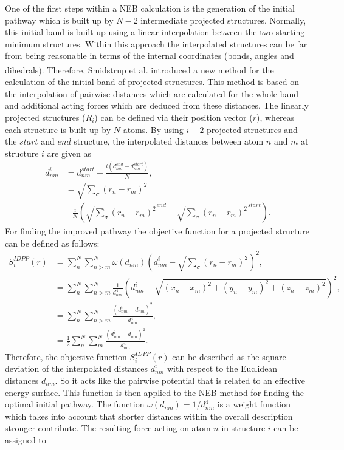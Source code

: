 \documentclass[a4paper,11pt]{scrartcl}
\newcommand{\myCite}[1]{\textsuperscript{\cite{#1}}}
\begin{document}
\begin{itemize}
One of the first steps within a NEB calculation is the generation of the initial pathway which is built up by $N-2$ intermediate projected structures. Normally, this initial band is built up using a linear interpolation between the two starting minimum structures. Within this approach the interpolated structures can be far from being reasonable in terms of the internal coordinates (bonds, angles and dihedrals). Therefore, Smidstrup et al.\myCite{Smidstrup2014} introduced a new method for the calculation of the initial band of projected structures. This method is based on the interpolation of pairwise distances which are calculated for the whole band and additional acting forces which are deduced from these distances. The linearly projected structures ($R_{i}$) can be defined via their position vector ($r$), whereas each structure is built up by $N$ atoms. By using $i-2$ projected structures and the $start$ and $end$ structure, the interpolated distances between atom $n$ and $m$ at structure $i$	are given as
\begin{equation}
\begin{aligned}
d^{i}_{nm} &= d^{start}_{nm} + \frac{i\left(d^{end}_{nm}-d^{start}_{nm}\right)}{N},\\
					 &=\sqrt{\sum_{\sigma}\left(r_{n}-r_{m}\right)^2}\\
					 &+\frac{i}{N}\left(\sqrt{\sum_{\sigma}\left(r_{n}-r_{m}\right)^2}^{end}-\sqrt{\sum_{\sigma}\left(r_{n}-r_{m}\right)^2}^{start}\right).	
\end{aligned}
\end{equation}
For finding the improved pathway the objective function for a projected structure can be defined as follows:
\begin{equation}
\begin{aligned}
S^{IDPP}_{i}(r) &=\sum^{N}_{n}\sum^{N}_{n>m}\omega (d_{nm}) \left(d^{i}_{nm}-\sqrt{\sum_{\sigma}\left(r_{n}-r_{m}\right)^2}\right)^{2},\\
								&=\sum^{N}_{n}\sum^{N}_{n>m} \frac{1}{d^{4}_{nm}} \left(d^{i}_{nm}-\sqrt{\left(x_{n}-x_{m}\right)^{2}+\left(y_{n}-y_{m}\right)^{2}+\left(z_{n}-z_{m}\right)^{2}}\right)^{2},\\
								&=\sum^{N}_{n}\sum^{N}_{n>m} \frac{\left(d^{i}_{nm}-d_{nm} \right)^{2}}{d^{4}_{nm}},\\
								&=\frac{1}{2}\sum^{N}_{n}\sum^{N}_{m} \frac{\left(d^{i}_{nm}-d_{nm} \right)^{2}}{d^{4}_{nm}}.
\end{aligned}
\end{equation}
 Therefore, the objective function $S^{IDPP}_{i}(r)$ can be described as the square deviation of the interpolated distances $d^{i}_{nm}$ with respect to the Euclidean distances $d_{nm}$. So it acts like the pairwise potential that is related to an effective energy surface. This function is then applied to the NEB method for finding the optimal initial pathway. The function $\omega(d_{nm})=1/d^{4}_{nm}$ is a weight function which takes into account that shorter distances within the overall description stronger contribute. The resulting force acting on atom $n$ in structure $i$ can be assigned to


\end{itemize}
\end{document}
